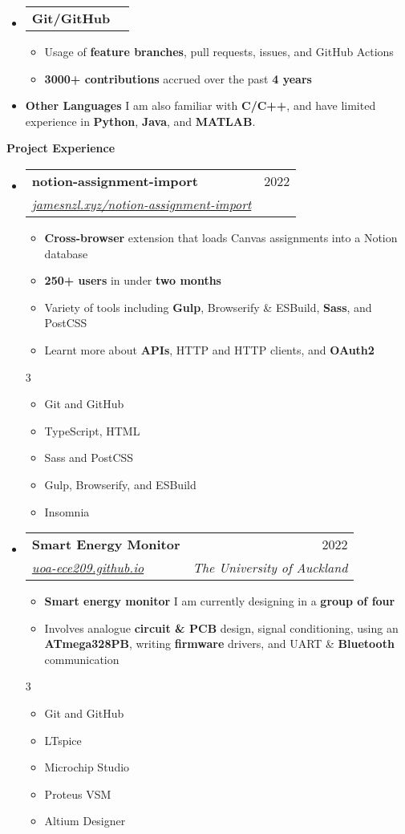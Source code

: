 \documentclass[11pt,a4paper]{article}[leftmargin=*]
\makeatletter
\def \entryspacing {-0pt}
\def \bulletstylei {\faAngleRight\hspace{-4.5pt}}
\def \bulletstyleii {\faCaretRight\hspace{-4.5pt}}
\renewcommand{\section}[2]{\vspace{5pt}
  \colorbox{secondary}{\color{white}\raggedbottom\normalsize\textbf{{#1}{\hspace{2pt}#2\hspace{4pt}}}}
}
\newcommand{\resumeEntryStart}{\begin{itemize}[leftmargin=2.5mm]}
\newcommand{\resumeEntryEnd}{\end{itemize}\vspace{\entryspacing}}
\newcommand{\resumeItemListStart}{\begin{itemize}[leftmargin=4.5mm]}
\newcommand{\resumeItemListEnd}{\end{itemize}}
\newcommand{\resumeItemListStartColumns}[2][-0.5]{\vspace*{#1\multicolsep}
\begin{multicols}{#2}\begin{itemize}[leftmargin=4.5mm]}
\newcommand{\resumeItemListEndColumns}[1][-1]{\end{itemize}\end{multicols}\vspace*{#1\multicolsep}}
\newcommand{\resumeItem}[2][\bulletstylei]{
  \item[\small#1]\small{
    {#2 \vspace{-2pt}}
  }
}
\newcommand{\resumeEntryTSDL}[4]{
  \vspace{-1pt}\item[]
    \begin{tabularx}{0.97\textwidth}{X@{\hspace{60pt}}r}
      \textbf{\color{primary}#1} & {\firabook\color{accent}\small#2} \\
      \textit{\color{accent}\small#3} & \textit{\color{accent}\small#4} \\
    \end{tabularx}\vspace{-6pt}
}
\newcommand{\resumeEntryTD}[2]{
  \vspace{-1pt}\item[]
    \begin{tabularx}{0.97\textwidth}{X@{\hspace{60pt}}r}
      \textbf{\color{primary}#1} & {\firabook\color{accent}\small#2} \\
    \end{tabularx}\vspace{-6pt}
}
\newcommand{\resumeEntryS}[2]{
  \item[]\small{
    \textbf{\color{primary}#1 }{ #2 \vspace{-2pt}}
  }
}
\newcommand{\resumeBf}[1]{\small\textbf{\color{halfbold}#1}}
\makeatother
\begin{document}
\vspace*{-0.5\baselineskip}

\resumeEntryStart
\resumeEntryTD
{Git/GitHub}{}
\resumeItemListStart
\resumeItem {Usage of \resumeBf{feature branches}, pull requests, issues, and GitHub Actions}
\resumeItem {\resumeBf{3000+ contributions} accrued over the past \resumeBf{4 years}}
\resumeItemListEnd
\resumeEntryEnd

\vspace*{-0.5\baselineskip}

\resumeEntryStart
\resumeEntryS
{Other Languages}{I am also familiar with \resumeBf{C/C++}, and have limited experience in \resumeBf{Python}, \resumeBf{Java}, and \resumeBf{MATLAB}.}
\resumeEntryEnd


\section{\faFlask}{Project Experience}

\resumeEntryStart
\resumeEntryTSDL
{notion-assignment-import}{2022}
{\href{https://jamesnzl.xyz/notion-assignment-import}{jamesnzl.xyz/notion-assignment-import}}{}
\resumeItemListStart
\resumeItem {\resumeBf{Cross-browser} extension that loads Canvas assignments into a Notion database}
\resumeItem {\resumeBf{250+ users} in under \resumeBf{two months}}
\resumeItem {Variety of tools including \resumeBf{Gulp}, Browserify \& ESBuild, \resumeBf{Sass}, and PostCSS}
\resumeItem {Learnt more about \resumeBf{APIs}, HTTP and HTTP clients, and \resumeBf{OAuth2}}
\resumeItemListEnd
\resumeItemListStartColumns{3}
\resumeItem[\bulletstyleii] {Git and GitHub}
\resumeItem[\bulletstyleii] {TypeScript, HTML}
\resumeItem[\bulletstyleii] {Sass and PostCSS}
\resumeItem[\bulletstyleii] {Gulp, Browserify, and ESBuild}
\resumeItem[\bulletstyleii] {Insomnia}
\resumeItemListEndColumns
\resumeEntryEnd

\vspace*{-0.5\baselineskip}

\resumeEntryStart
\resumeEntryTSDL
{Smart Energy Monitor}{2022}
{\href{https://uoa-ece209.github.io}{uoa-ece209.github.io}}{The University of Auckland}
\resumeItemListStart
\resumeItem {\resumeBf{Smart energy monitor} I am currently designing in a \resumeBf{group of four}}
\resumeItem {Involves analogue \resumeBf{circuit \& PCB} design, signal conditioning, using an \resumeBf{ATmega328PB}, writing \resumeBf{firmware} drivers, and UART \& \resumeBf{Bluetooth} communication}
\resumeItemListEnd
\resumeItemListStartColumns{3}
\resumeItem[\bulletstyleii] {Git and GitHub}
\resumeItem[\bulletstyleii] {LTspice}
\resumeItem[\bulletstyleii] {Microchip Studio}
\resumeItem[\bulletstyleii] {Proteus VSM}
\resumeItem[\bulletstyleii] {Altium Designer}
\resumeItemListEndColumns
\resumeEntryEnd
\end{document}
